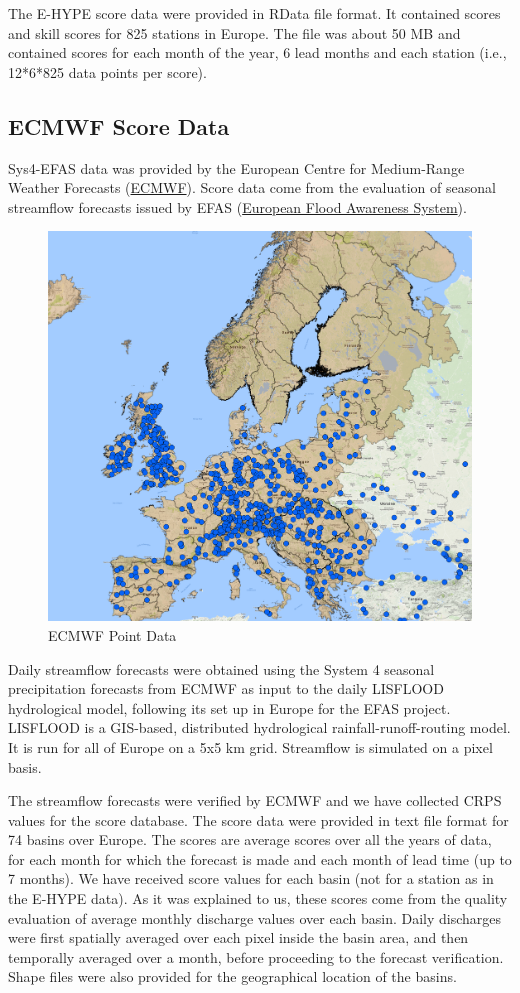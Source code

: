 \documentclass[logos,parttoc,morelanguage=french,morelanguage=german,draft]{orsay-memoire}
\begin{document}
The E-HYPE score data were provided in RData file format. It contained scores and skill scores for 825 stations in Europe. The file was about 50 MB and contained scores for each month of the year, 6 lead months and each station (i.e., 12*6*825 data points per score).

\subsection{ECMWF Score Data}

\gls{Sys4-EFAS} data was provided by the European Centre for Medium-Range Weather Forecasts (\href{http://www.ecmwf.int}{ECMWF}). Score data come from the evaluation of seasonal streamflow forecasts issued by EFAS (\href{https://www.efas.eu/about-efas.html}{European Flood Awareness System}).

\begin{figure}[H]
\centering
\includegraphics[width=0.8\linewidth]{images/gisEFASpoints.png}
  \caption{ECMWF Point Data}
  \label{fig:ECMWFdata}
\end{figure}

Daily streamflow forecasts were obtained using the System 4 seasonal precipitation forecasts from ECMWF as input to the daily LISFLOOD hydrological model, following its set up in Europe for the EFAS project. LISFLOOD is a GIS-based, distributed hydrological rainfall-runoff-routing model. It is run for all of Europe on a 5x5 km grid. Streamflow is simulated on a pixel basis.

The streamflow forecasts were verified by ECMWF and we have collected CRPS values for the score database. The score data were provided in text file format for 74 basins over Europe. The scores are average scores over all the years of data, for each month for which the forecast is made and each month of lead time (up to 7 months). We have received score values for each basin (not for a station as in the E-HYPE data).  As it was explained to us, these scores come from the quality evaluation of average monthly discharge values over each basin. Daily discharges were first spatially averaged over each pixel inside the basin area, and then temporally averaged over a month, before proceeding to the forecast verification. Shape files were also provided for the geographical location of the basins.
\end{document}
